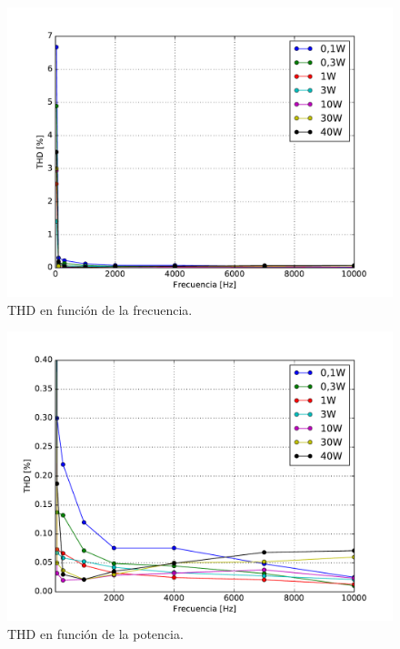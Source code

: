 		\begin{figure}[H]
			\centering
			\includegraphics[scale=0.6]{./Figuras/thd.pdf}
			\caption{THD en función de la frecuencia.}
			\label{fig:thd}
		\end{figure}

		\begin{figure}[H]
			\centering
			\includegraphics[scale=0.6]{./Figuras/thd_zoom.pdf}
			\caption{THD en función de la potencia.}
		\end{figure}



%
%
